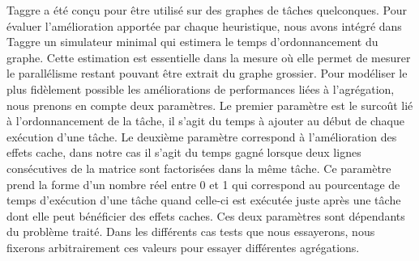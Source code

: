 Taggre a été conçu pour être utilisé sur des graphes de tâches quelconques.
%
Pour évaluer l'amélioration apportée par chaque heuristique, nous avons intégré dans Taggre un simulateur minimal qui estimera le temps d'ordonnancement du graphe.
%
Cette estimation est essentielle dans la mesure où elle permet de mesurer le parallélisme restant pouvant être extrait du graphe grossier.
%
Pour modéliser le plus fidèlement possible les améliorations de performances liées à l'agrégation, nous prenons en compte deux paramètres.
%
Le premier paramètre est le surcoût lié à l'ordonnancement de la tâche, il s'agit du temps à ajouter au début de chaque exécution d'une tâche.
%
Le deuxième paramètre correspond à l'amélioration des effets cache, dans notre cas il s'agit du temps gagné lorsque deux lignes consécutives de la matrice sont factorisées dans la même tâche.
%
Ce paramètre prend la forme d'un nombre réel entre 0 et 1 qui correspond au pourcentage de temps d'exécution d'une tâche quand celle-ci est exécutée juste après une tâche dont elle peut bénéficier des effets caches.
%
Ces deux paramètres sont dépendants du problème traité.
%
Dans les différents cas tests que nous essayerons, nous fixerons arbitrairement ces valeurs pour essayer différentes agrégations.
